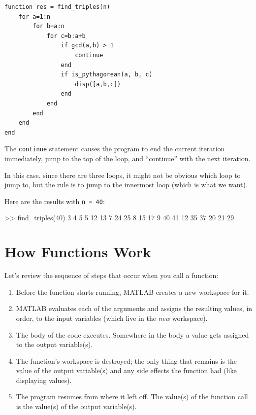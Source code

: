 \documentclass[../../book.tex]{subfiles}
\begin{document}
\begin{lstlisting}[caption={Our final Pythagorean triples function}, label={lst:triples_function}]
function res = find_triples(n)
    for a=1:n
        for b=a:n
            for c=b:a+b
                if gcd(a,b) > 1
	                continue
                end
                if is_pythagorean(a, b, c)
                    disp([a,b,c])
                end
            end
        end
    end
end
\end{lstlisting}

The \lstinline{continue} statement  causes the program to end the current iteration
immediately, jump to the top of the loop, and ``continue'' with the next iteration.

In this case, since there are three loops, it might not be obvious which loop to jump to, but the rule is to jump to the innermost loop (which is what we want).

Here are the results with \lstinline{n = 40}:

\begin{code}
>> find_triples(40)
     3     4     5
     5    12    13
     7    24    25
     8    15    17
     9    40    41
    12    35    37
    20    21    29
\end{code}


\section{How Functions Work}

Let's review the sequence of steps that occur when you call a function:

\begin{enumerate}

\item Before the function starts running, MATLAB creates a new
workspace for it.

\item MATLAB evaluates each of the arguments and assigns
the resulting values, in order, to the input variables (which
live in the \emph{new} workspace).

\item The body of the code executes.  Somewhere in the body
a value gets assigned to the output variable(s).

\item The function's workspace is destroyed; the only thing
that remains is the value of the output variable(s) and any side
effects the function had (like displaying values).

\item The program resumes from where it left off.  The value(s)
of the function call is the value(s) of the output variable(s).

\end{enumerate}
\end{document}
